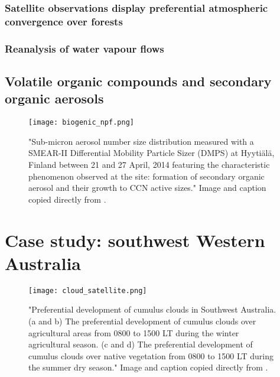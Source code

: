 \subsubsection{Satellite observations display preferential atmospheric convergence over forests}

\subsubsection{Reanalysis of water vapour flows}

\subsection[VOCs and SOAs]{Volatile organic compounds and secondary organic aerosols}

\begin{figure}[!ht]
	\centering
	\texttt{[image: biogenic\_npf.png]}
	\caption[Secondary organic aerosols growing into CCN active sizes]{"Sub-micron aerosol number size distribution measured with a SMEAR-II Differential Mobility Particle Sizer (DMPS) at Hyytiälä, Finland between 21 and 27 April, 2014 featuring the characteristic phenomenon observed at the site: formation of secondary organic aerosol and their growth to CCN active sizes." Image and caption copied directly from \citet{petaja2016}.}
	\label{fig:biogenic_npf}
\end{figure}

\section{Case study: southwest Western Australia}

\begin{figure}[!ht]
	\centering
	\texttt{[image: cloud\_satellite.png]}
	\caption[Satellite image of delineated cumulus development along fence]{"Preferential development of cumulus clouds in Southwest Australia. (a and b) The preferential development of cumulus clouds over agricultural areas from 0800 to 1500 LT during the winter agricultural season. (c and d) The preferential development of cumulus clouds over native vegetation from 0800 to 1500 LT during the summer dry season." Image and caption copied directly from \citet{ray2003}.}
	\label{fig:cloud_satellite}
\end{figure}